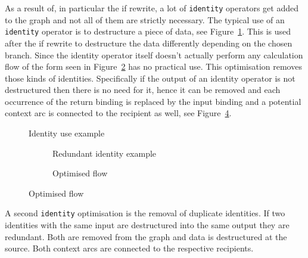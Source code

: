 As a result of, in particular the if rewrite, a lot of \texttt{identity} operators get added to the graph and not all of them are strictly necessary.
The typical use of an \texttt{identity} operator is to destructure a piece of data, see Figure~\ref{fig:identity-example}.
This is used after the if rewrite to destructure the data differently  depending on the chosen branch.
Since the identity operator itself doesn't actually perform any calculation flow of the form seen in Figure~\ref{fig:redundant-identity-example} has no practical use.
This optimisation removes those kinds of identities.
Specifically if the output of an identity operator is not destructured then there is no need for it, hence it can be removed and each occurrence of the return binding is replaced by the input binding and a potential context arc is connected to the recipient as well, see Figure~\ref{fig:redundant-identity-example-rewritten}.

\begin{figure}
    \caption{Identity use example}
    \label{fig:identity-example}
\end{figure}

\begin{figure}
    \begin{subfigure}[b]{.5\textwidth}
        \caption{Redundant identity example}
        \label{fig:redundant-identity-example}
    \end{subfigure}
    \begin{subfigure}[b]{.5\textwidth}
        \caption{Optimised flow}
        \label{fig:redundant-identity-example-rewritten}
    \end{subfigure}

\end{figure}

A second \texttt{identity} optimisation is the removal of duplicate identities.
If two identities with the same input are destructured into the same output they are redundant.
Both are removed from the graph and data is destructured at the source.
Both context arcs are connected to the respective recipients.
